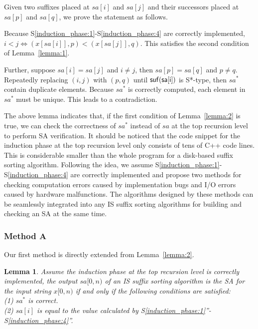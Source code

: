 \documentclass[10pt,journal,compsoc]{IEEEtran}
\newtheorem{lemma}[theorem]{Lemma}
\begin{document}
\begin{IEEEproof} Given two suffixes placed at $sa[i]$ and $sa[j]$ and their successors placed at $sa[p]$ and $sa[q]$, we prove the statement as follows.

Because S\ref{induction_phase:1}-S\ref{induction_phase:4} are correctly implemented, $i < j \iff (x[sa[i]], p) < (x[sa[j]], q)$. This satisfies the second condition of Lemma~\ref{lemma:1}.

Further, suppose $sa[i] = sa[j]$ and $i \ne j$, then $sa[p] = sa[q]$ and $p \ne q$. Repeatedly replacing $(i, j)$ with $(p, q)$ until $\sf suf(sa[i])$ is S*-type, then $sa^*$ contain duplicate elements. Because $sa^*$ is correctly computed, each element in $sa^*$ must be unique. This leads to a contradiction.
\end{IEEEproof}

The above lemma indicates that, if the first condition of Lemma~\ref{lemma:2} is true, we can check the correctness of $sa^*$ instead of $sa$ at the top recursion level to perform SA verification. It should be noticed that the code snippet for the induction phase at the top recursion level only consists of tens of C++ code lines. This is considerable smaller than the whole program for a disk-based suffix sorting algorithm. Following the idea, we assume S\ref{induction_phase:1}-S\ref{induction_phase:4} are correctly implemented and propose two methods for checking computation errors caused by implementation bugs and I/O errors caused by hardware malfunctions. The algorithms designed by these methods can be seamlessly integrated into any IS suffix sorting algorithms for building and checking an SA at the same time.

\subsubsection{Method A} \label{sec:proposals:method_a}

Our first method is directly extended from Lemma~\ref{lemma:2}.

\begin{lemma} \label{lemma:3}
	Assume the induction phase at the top recursion level is correctly implemented, the output $sa[0, n)$ of an IS suffix sorting algorithm is the SA for the input string $x[0, n)$ if and only if the following conditions are satisfied: \\
	(1) $sa^*$ is correct. \\
	(2) $sa[i]$ is equal to the value calculated by S\ref{induction_phase:1}''-S\ref{induction_phase:4}''. \\
	
\end{lemma}
\end{document}
